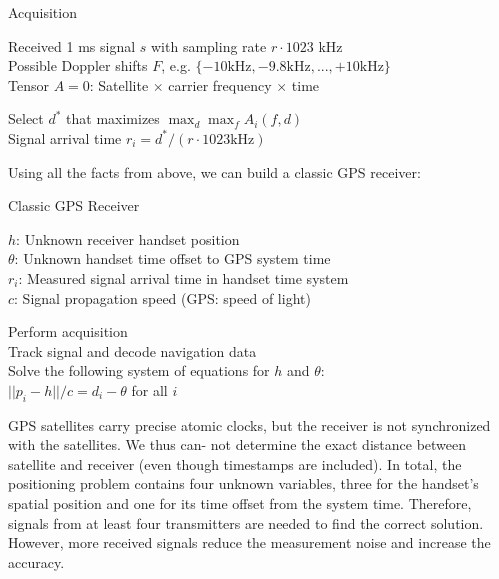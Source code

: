 \begin{algorithm}[H]
\caption{Acquisition}
	Received 1 ms signal $s$ with sampling rate $r \cdot 1023$ kHz \\
	Possible Doppler shifts $F$, e.g. $\{-10 \text{kHz}, -9.8 \text{kHz}, ..., +10 \text{kHz}\}$ \\
	Tensor $A = 0$: Satellite $\times$ carrier frequency $\times$ time
	
	\BlankLine
	
	Select $d^*$ that maximizes $\max_d \max_f A_i(f,d)$ \\
	Signal arrival time $r_i = d^* / (r \cdot 1023 \text{kHz})$
\end{algorithm}
\medskip

Using all the facts from above, we can build a classic GPS receiver:\medskip

\begin{algorithm}[H]
\caption{Classic GPS Receiver}
	$h$: Unknown receiver handset position \\
	$\theta$: Unknown handset time offset to GPS system time \\
	$r_i$: Measured signal arrival time in handset time system \\
	$c$: Signal propagation speed (GPS: speed of light)
	
	\BlankLine
	
	Perform acquisition \\
	Track signal and decode navigation data \\
	
	Solve the following system of equations for $h$ and $\theta$: \\
	$||p_i - h|| / c = d_i - \theta$ for all $i$
\end{algorithm}
\medskip

GPS satellites carry precise atomic clocks, but the receiver is not synchronized with the satellites. We thus can- not determine the exact distance between satellite and receiver (even though timestamps are included). In total, the positioning problem contains four unknown variables, three for the handset's spatial position and one for its time offset from the system time. Therefore, signals from at least four transmitters are needed to find the correct solution. However, more received signals reduce the measurement noise and increase the accuracy. \medskip

